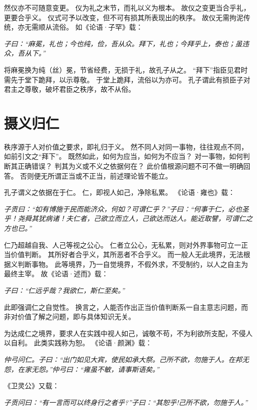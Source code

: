\documentclass[11pt]{article}
\begin{document}
然仪亦不可随意变更。
仪为礼之末节，而礼以义为根本。
故仪之变更当合乎礼，更要合乎义。
仪式可予以改变，但不可有损其所表现出的秩序。
故仪无需拘泥传统，亦无需顺从流俗。
如《论语·子罕》载：

\textit{子曰：“麻冕，礼也；今也纯，俭，吾从众。拜下，礼也；今拜乎上，泰也；虽违众，吾从下。”}

将麻冕换为纯（丝）冕，节省经费，无损于礼，故孔子从之。
“拜下”指臣见君时需先于堂下跪拜，以示尊敬。
于堂上跪拜，流俗以为亦可。
孔子谓此有损臣子对君主之尊敬，破坏君臣之秩序，故不从俗。

\newline

\section{摄义归仁}
秩序源于人对价值之要求，即礼归于义。
然不同人对同一事物，往往观点不同，如前引文之“拜下”。
既然如此，如何为应当，如何为不应当？
对一事物，如何判断其正确错误？
判其为义或不义之依据何在？
此价值根源问题不可不做一明确回答。
否则便无所谓正当或不正当，前述理论皆不能立。

\newline

孔子谓义之依据在于仁。
仁，即视人如己，净除私累。
《论语·雍也》载：

\textit{子贡曰：“如有博施于民而能济众，何如？可谓仁乎？”子曰：“何事于仁，必也圣乎！尧舜其犹病诸！夫仁者，己欲立而立人，己欲达而达人。能近取譬，可谓仁之方也已。”}

仁乃超越自我、人己等视之公心。
仁者立公心，无私累，则对外界事物可立一正当价值判断。
其所好者合乎义，其所恶者不合乎义。
而一般人无此境界，无法根据义判断事物。
此等境界，乃一自觉境界，不假外求，不受制约，以人之自主为最终主宰。
故《论语·述而》载：

\textit{子曰：“仁远乎哉？我欲仁，斯仁至矣。”}

此即强调仁之自觉性。
换言之，人能否作出正当价值判断系一自主意志问题，而非对价值了解之问题，即与具体知识无关。

\newline

为达成仁之境界，要求人在实践中视人如己，诚敬不苟，不为利欲所支配，不侵人以自利。
此类实践称为恕。
《论语·颜渊》载：

\textit{仲弓问仁。子曰：“出门如见大宾，使民如承大祭。己所不欲，勿施于人。在邦无怨，在家无怨。”仲弓曰：“雍虽不敏，请事斯语矣。”}

《卫灵公》又载：

\textit{子贡问曰：“有一言而可以终身行之者乎?”子曰：“其恕乎!己所不欲，勿施于人。”}
\end{document}
